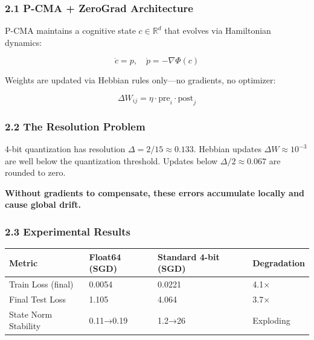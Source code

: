 \documentclass[
  11pt,
  a4paper,
]{article}
\begin{document}
\subsubsection{2.1 P-CMA + ZeroGrad
Architecture}\label{p-cma-zerograd-architecture}

P-CMA maintains a cognitive state \(c \in \mathbb{R}^d\) that evolves
via Hamiltonian dynamics:

\[
\dot{c} = p, \quad \dot{p} = -\nabla\Phi(c)
\]

Weights are updated via Hebbian rules only---no gradients, no optimizer:

\[
\Delta W_{ij} = \eta \cdot \text{pre}_i \cdot \text{post}_j
\]

\subsubsection{2.2 The Resolution Problem}\label{the-resolution-problem}

4-bit quantization has resolution \(\Delta = 2/15 \approx 0.133\).
Hebbian updates \(\Delta W \approx 10^{-3}\) are well below the
quantization threshold. Updates below \(\Delta/2 \approx 0.067\) are
rounded to zero.

\textbf{Without gradients to compensate, these errors accumulate locally
and cause global drift.}

\subsubsection{2.3 Experimental Results}\label{experimental-results}

\begin{longtable}[]{@{}llll@{}}
\toprule\noalign{}
Metric & Float64 (SGD) & Standard 4-bit (SGD) & Degradation \\
\midrule\noalign{}
\endhead
\bottomrule\noalign{}
\endlastfoot
Train Loss (final) & 0.0054 & 0.0221 & 4.1× \\
Final Test Loss & 1.105 & 4.064 & 3.7× \\
State Norm Stability & 0.11→0.19 & 1.2→26 & Exploding \\
\end{longtable}
\end{document}

